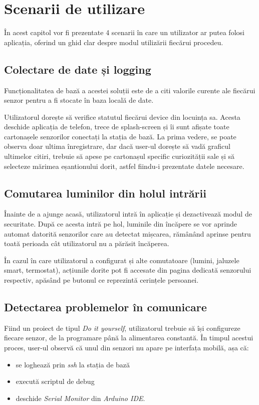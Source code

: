 \chapter{Scenarii de utilizare}

În acest capitol vor fi prezentate 4 scenarii în care un utilizator ar putea folosi aplicația, oferind un ghid clar despre modul utilizării fiecărui procedeu.

\section{Colectare de date și logging}

Funcționalitatea de bază a acestei soluții este de a citi valorile curente ale fiecărui senzor pentru a fi stocate în baza locală de date.

Utilizatorul dorește să verifice statutul fiecărui device din locuința sa. Acesta deschide aplicația de telefon, trece de splash-screen și îi sunt afișate toate cartonașele senzorilor conectați la stația de bază. La prima vedere, se poate observa doar ultima înregistrare, dar dacă user-ul dorește să vadă graficul ultimelor citiri, trebuie să apese pe cartonașul specific curiozității sale și să selecteze mărimea eșantionului dorit, astfel fiindu-i prezentate datele necesare. 

\section{Comutarea luminilor din holul intrării}

Înainte de a ajunge acasă, utilizatorul intră în aplicație și dezactivează modul de securitate. După ce acesta intră pe hol, luminile din încăpere se vor aprinde automat datorită senzorilor care au detectat mișcarea, rămânând aprinse pentru toată perioada cât utilizatorul nu a părăsit încăperea. 

În cazul în care utilizatorul a configurat și alte comutatoare (lumini, jaluzele smart, termostat), acțiunile dorite pot fi accesate din pagina dedicată senzorului respectiv, apăsând pe butonul ce reprezintă cerințele persoanei.

\section{Detectarea problemelor în comunicare}

Fiind un proiect de tipul \emph{Do it yourself}, utilizatorul trebuie să își configureze fiecare senzor, de la programare până la alimentarea constantă. În timpul acestui proces, user-ul observă că unul din senzori nu apare pe interfața mobilă, așa că:
\begin{itemize}
	\item se loghează prin \emph{ssh} la stația de bază 
	\item execută scriptul de debug
	\item deschide \emph{Serial Monitor} din \emph{Arduino IDE}.
\end{itemize}

